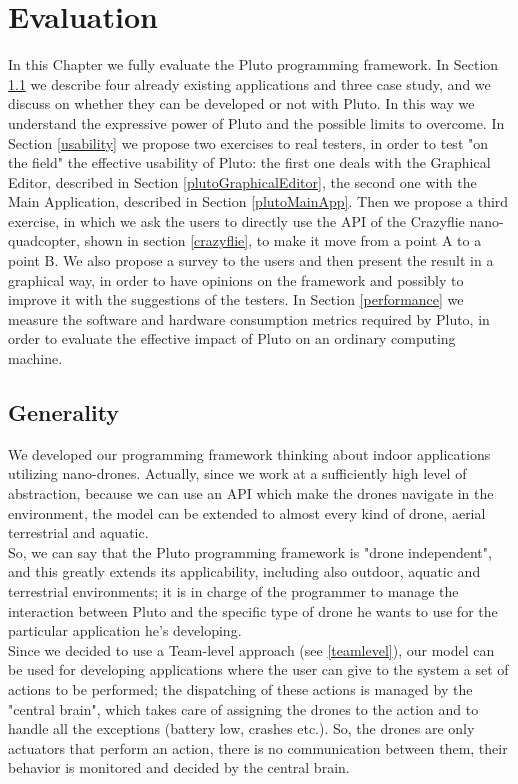 \chapter{Evaluation}
\label{cap6}

In this Chapter we fully evaluate the Pluto programming framework.
In Section \ref{applicability} we describe four already existing applications and three case study, and we discuss on whether they can be developed or not with Pluto. 
In this way we understand the expressive power of Pluto and the possible limits to overcome.
In Section \ref{usability} we propose two exercises to real testers, in order to test "on the field" the effective usability of Pluto:
the first one deals with the Graphical Editor, described in Section \ref{plutoGraphicalEditor}, the second one with the Main Application, described in Section \ref{plutoMainApp}.
Then we propose a third exercise, in which we ask the users to directly use the API of the Crazyflie nano-quadcopter, shown in section \ref{crazyflie}, to make it move from a point A to a point B.
We also propose a survey to the users and then present the result in a graphical way, in order to have opinions on the framework and possibly to improve it with the suggestions of the testers.
In Section \ref{performance} we measure the software and hardware consumption metrics required by Pluto, in order to evaluate the effective impact of Pluto on an ordinary computing machine.


\section{Generality}\label{applicability}

We developed our programming framework thinking about indoor applications utilizing nano-drones.
Actually, since we work at a sufficiently high level of abstraction, because we can use an API which make the drones navigate in the environment, the model can be extended to almost every kind of drone, aerial terrestrial and aquatic.
\\
So, we can say that the Pluto programming framework is "drone independent", and this greatly extends its applicability, including also outdoor, aquatic and terrestrial environments; it is in charge of the programmer to manage the interaction between Pluto and the specific type of drone he wants to use for the particular application he's developing.
\\

Since we decided to use a Team-level approach (see \ref{teamlevel}), our model can be used for developing applications where the user can give to the system a set of actions to be performed; the dispatching of these actions is managed by the "central brain", which takes care of assigning the drones to the action and to handle all the exceptions (battery low, crashes etc.). So, the drones are only actuators that perform an action, there is no communication between them, their behavior is monitored and decided by the central brain.
\\

